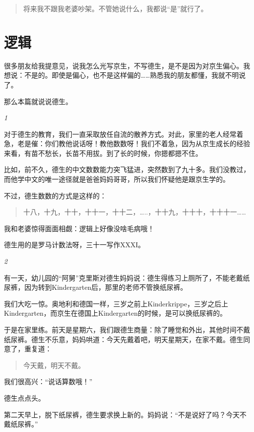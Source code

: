 \documentclass[twoside,openright,headings=optiontohead]{ctexbook} %
\begin{document}
{\begin{quote}
将来我不跟我老婆吵架。不管她说什么，我都说``是''就行了。
\end{quote}

\chapter*{逻辑}\label{logic}

很多朋友给我提意见，说我怎么光写京生，不写德生，是不是因为对京生偏心。我想说：不是的。即使是偏心，也不是这样偏的\ldots{}\ldots{}熟悉我的朋友都懂，我就不明说了。

那么本篇就说说德生。

\emph{1}

对于德生的教育，我们一直采取放任自流的散养方式。对此，家里的老人经常着急，老是催：你们教他说话呀！教他数数呀！我们不着急，因为从京生成长的经验来看，有苗不愁长，长苗不用拔。到了长的时候，你摁都摁不住。

比如，前不久，德生的中文数数能力突飞猛进，突然数到了九十多。我们没教过，而他学中文的唯一途径就是爸爸妈妈哥哥，所以我们怀疑他是跟京生学的。

不过，德生数数的方式是这样的：

\begin{quote}
十八，十九，十十，十十一，十十二，\ldots{}..，十十九，十十十，十十十一\ldots{}\ldots{}
\end{quote}

我和老婆惊得面面相觑：逻辑上好像没啥毛病哦！

德生用的是罗马计数法呀，三十一写作XXXI。

\emph{2}

有一天，幼儿园的``阿舅''克里斯对德生妈妈说：德生得练习上厕所了，不能老戴纸尿裤，因为转到Kindergarten后，那里的老师不管换纸尿裤。

我们大吃一惊。奥地利和德国一样，三岁之前上Kinderkrippe，三岁之后上Kindergarten，而京生在德国上Kindergarten的时候，是可以换纸尿裤的。

于是在家里练。前天是星期六，我们跟德生商量：除了睡觉和外出，其他时间不戴纸尿裤。德生不乐意，妈妈哄道：今天先戴着吧，明天星期天，在家不戴。德生同意了，重复道：

\begin{quote}
今天戴，明天不戴。
\end{quote}

我们很高兴：``说话算数哦！''

德生点点头。

第二天早上，脱下纸尿裤，德生要求换上新的。妈妈说：``不是说好了吗？今天不戴纸尿裤。''

}
\end{document}
